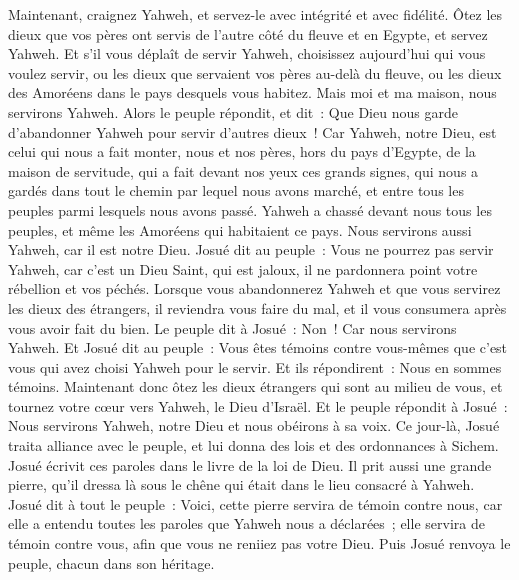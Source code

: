 \begin{multicols}{2}
Maintenant, craignez Yahweh, et servez-le avec intégrité et avec fidélité. Ôtez les dieux que vos pères ont servis de l'autre côté du fleuve et en Egypte, et servez Yahweh.
Et s'il vous déplaît de servir Yahweh, choisissez aujourd'hui qui vous voulez servir, ou les dieux que servaient vos pères au-delà du fleuve, ou les dieux des Amoréens dans le pays desquels vous habitez. Mais moi et ma maison, nous servirons Yahweh.
Alors le peuple répondit, et dit~: Que Dieu nous garde d'abandonner Yahweh pour servir d'autres dieux~!
Car Yahweh, notre Dieu, est celui qui nous a fait monter, nous et nos pères, hors du pays d'Egypte, de la maison de servitude, qui a fait devant nos yeux ces grands signes, qui nous a gardés dans tout le chemin par lequel nous avons marché, et entre tous les peuples parmi lesquels nous avons passé.
Yahweh a chassé devant nous tous les peuples, et même les Amoréens qui habitaient ce pays. Nous servirons aussi Yahweh, car il est notre Dieu.
Josué dit au peuple~: Vous ne pourrez pas servir Yahweh, car c'est un Dieu Saint, qui est jaloux, il ne pardonnera point votre rébellion et vos péchés.
Lorsque vous abandonnerez Yahweh et que vous servirez les dieux des étrangers, il reviendra vous faire du mal, et il vous consumera après vous avoir fait du bien.
Le peuple dit à Josué~: Non~! Car nous servirons Yahweh.
Et Josué dit au peuple~: Vous êtes témoins contre vous-mêmes que c'est vous qui avez choisi Yahweh pour le servir. Et ils répondirent~: Nous en sommes témoins.
Maintenant donc ôtez les dieux étrangers qui sont au milieu de vous, et tournez votre cœur vers Yahweh, le Dieu d'Israël.
Et le peuple répondit à Josué~: Nous servirons Yahweh, notre Dieu et nous obéirons à sa voix.
Ce jour-là, Josué traita alliance avec le peuple, et lui donna des lois et des ordonnances à Sichem.
Josué écrivit ces paroles dans le livre de la loi de Dieu. Il prit aussi une grande pierre, qu'il dressa là sous le chêne qui était dans le lieu consacré à Yahweh.
Josué dit à tout le peuple~: Voici, cette pierre servira de témoin contre nous, car elle a entendu toutes les paroles que Yahweh nous a déclarées~; elle servira de témoin contre vous, afin que vous ne reniiez pas votre Dieu.
Puis Josué renvoya le peuple, chacun dans son héritage.

\end{multicols}
